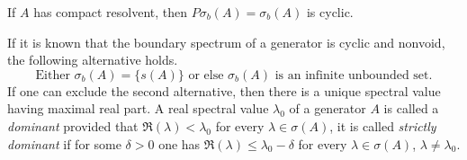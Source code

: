 \begin{corollary}\label{cor:b3-2.10}
If\/ $A$ has compact resolvent, then $P\sigma_{b}(A) = \sigma_{b}(A)$ is cyclic.
\end{corollary}
If it is known that the boundary spectrum of a generator is cyclic and nonvoid, the following alternative holds.
\begin{equation}\label{eq:b3-2.19}
\text{Either $\sigma_{b}(A) = \{ s(A) \} $ or else  $\sigma_{b}(A)$ is an infinite unbounded set.}
\end{equation}
If one can exclude the second alternative, then there is a unique spectral value having maximal real part.
A real spectral value $\lambda_{0}$ of a generator $A$ is called a \emph{dominant}
provided that $\Re(\lambda) < \lambda_{0}$ for every $\lambda \in \sigma(A)$, it is called \emph{strictly dominant}
if for some $\delta > 0$ one has $\Re(\lambda) \leq \lambda_{0} - \delta$ for every $\lambda \in \sigma(A)$, $\lambda \neq \lambda_{0}$.

